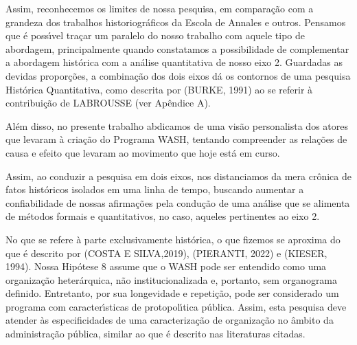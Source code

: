\documentclass[
12pt,		%
openright,	%
twoside,  %
a4paper,			%
chapter=TITLE,		%
english,			%
french,				%
spanish,			%
brazil				%
]{USPSC-classe/USPSC}
\begin{document}
Assim, reconhecemos os limites de nossa pesquisa, em compara\c{c}\~ao com a grandeza dos trabalhos historiogr\'aficos da Escola de Annales e outros. Pensamos que \'e poss\'{\i}vel tra\c{c}ar um paralelo do nosso trabalho com aquele tipo de abordagem, principalmente quando constatamos a possibilidade de complementar a abordagem hist\'orica com a an\'alise quantitativa de nosso eixo 2. Guardadas as devidas propor\c{c}\~oes, a combina\c{c}\~ao dos dois eixos d\'a os contornos de uma pesquisa Hist\'orica Quantitativa, como descrita por (BURKE, 1991) ao se referir \`a contribui\c{c}\~ao de LABROUSSE (ver Ap\^endice A).









Al\'em disso, no presente trabalho abdicamos de uma vis\~ao personalista dos atores que levaram \`a cria\c{c}\~ao do Programa WASH, tentando compreender as rela\c{c}\~oes de causa e efeito que levaram ao movimento que hoje est\'a em curso.









Assim, ao conduzir a pesquisa em dois eixos, nos distanciamos da mera cr\^onica de fatos hist\'oricos isolados em uma linha de tempo, buscando aumentar a confiabilidade de nossas afirma\c{c}\~oes pela condu\c{c}\~ao de uma an\'alise que se alimenta de m\'etodos formais e quantitativos, no caso, aqueles pertinentes ao eixo 2.









No que se refere \`a parte exclusivamente hist\'orica, o que fizemos se aproxima do que \'e descrito por (COSTA E SILVA,2019), (PIERANTI, 2022) e (KIESER, 1994). Nossa Hip\'otese 8 assume que o WASH pode ser entendido como uma organiza\c{c}\~ao heter\'arquica, n\~ao institucionalizada e, portanto, sem organograma definido. Entretanto, por sua longevidade e repeti\c{c}\~ao, pode ser considerado um programa com caracter\'{\i}sticas de protopol\'{\i}tica p\'ublica. Assim, esta pesquisa deve atender \`as especificidades de uma caracteriza\c{c}\~ao de organiza\c{c}\~ao no \^ambito da administra\c{c}\~ao p\'ublica, similar ao que \'e descrito nas literaturas citadas.
\end{document}
